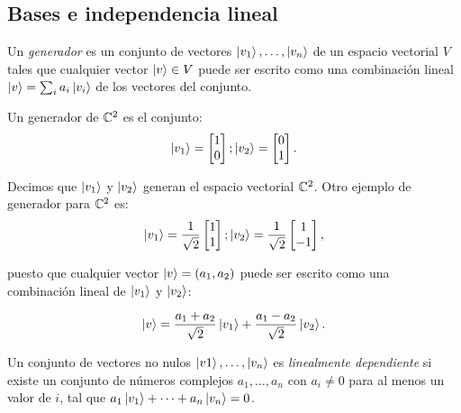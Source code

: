 \subsection{Bases e independencia lineal}
Un \emph{generador} es un conjunto de vectores $\ket{v_1}, \dots, \ket{v_n}$ de un espacio vectorial $V$ tales que cualquier vector $\ket{v}\in V$ puede ser escrito como una combinación lineal $\ket{v} = \sum_i a_i \ket{v_i}$ de los vectores del conjunto. 

\begin{ejemplo}
    Un generador de $\mathbb{C}^2$ es el conjunto:
\begin{equation*}
    \ket{v_1}= \begin{bmatrix}
        1\\0
    \end{bmatrix}; \ket{v_2} = \begin{bmatrix}
        0\\1
    \end{bmatrix}.
\end{equation*}
\end{ejemplo} 

Decimos que $\ket{v_1}$ y $\ket{v_2}$ generan el espacio vectorial $\mathbb{C}^2$. Otro ejemplo de generador para $\mathbb{C}^2$ es:
\begin{equation*}
    \ket{v_1}= \frac{1}{\sqrt{2}}\begin{bmatrix}
        1\\1
    \end{bmatrix}; \ket{v_2} = \frac{1}{\sqrt{2}}\begin{bmatrix}
        1\\-1
    \end{bmatrix},
\end{equation*}

puesto que cualquier vector $\ket{v}= (a_1, a_2)$ puede ser escrito como una combinación lineal de $\ket{v_1}$ y $\ket{v_2}$:

\begin{equation*}
    \ket{v}= \frac{a_1+a_2}{\sqrt{2}}\ket{v_1} +  \frac{a_1-a_2}{\sqrt{2}}\ket{v_2}.
\end{equation*}

\begin{definicion}
Un conjunto de vectores no nulos $\ket{v1}, \dots, \ket{v_n}$ es \emph{linealmente dependiente} si existe un conjunto de números complejos $a_1, \dots, a_n$ con $a_i\neq 0$ para al menos un valor de $i$, tal que $a_1\ket{v_1} + \dots + a_n\ket{v_n} = 0$.
\end{definicion}


